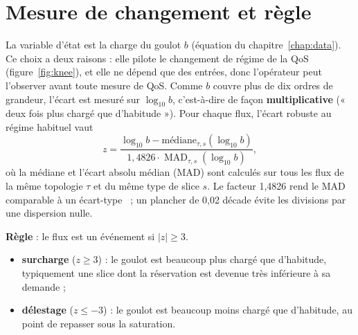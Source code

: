\documentclass[11pt,a4paper]{report}
\begin{document}
\section{Mesure de changement et règle}
La variable d'état est la charge du goulot $b$ (équation du chapitre~\ref{chap:data}). Ce choix a deux raisons : elle pilote le changement de régime de la QoS (figure~\ref{fig:knee}), et elle ne dépend que des entrées, donc l'opérateur peut l'observer avant toute mesure de QoS. Comme $b$ couvre plus de dix ordres de grandeur, l'écart est mesuré sur $\log_{10}b$, c'est-à-dire de façon \textbf{multiplicative} (« deux fois plus chargé que d'habitude »). Pour chaque flux, l'écart robuste au régime habituel vaut
\begin{equation}
z=\frac{\log_{10}b-\text{médiane}_{\tau,s}(\log_{10}b)}{1{,}4826\cdot\operatorname{MAD}_{\tau,s}(\log_{10}b)},
\end{equation}
où la médiane et l'écart absolu médian (MAD) sont calculés sur tous les flux de la même topologie $\tau$ et du même type de slice $s$. Le facteur 1,4826 rend le MAD comparable à un écart-type~\cite{mad} ; un plancher de 0,02 décade évite les divisions par une dispersion nulle.

\textbf{Règle} : le flux est un événement si $|z|\ge3$.
\begin{itemize}[nosep]
  \item \textbf{surcharge} ($z\ge3$) : le goulot est beaucoup plus chargé que d'habitude, typiquement une slice dont la réservation est devenue très inférieure à sa demande ;
  \item \textbf{délestage} ($z\le-3$) : le goulot est beaucoup moins chargé que d'habitude, au point de repasser sous la saturation.
\end{itemize}
\end{document}
